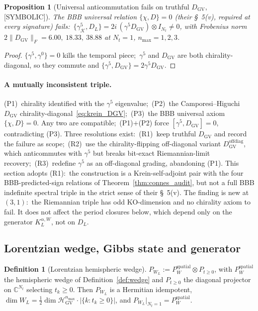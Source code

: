 \documentclass[11pt,a4paper]{article}
\theoremstyle{plain}
\newtheorem{proposition}[theorem]{Proposition}
\theoremstyle{definition}
\newtheorem{definition}[theorem]{Definition}
\newcommand{\nmax}{n_{\max}}
\newcommand{\Hilb}{\mathcal{H}}
\newcommand{\Frob}[1]{\lVert #1 \rVert_{F}}
\newcommand{\C}{\mathbb{C}}
\newcommand{\Krein}{\mathcal{K}}
\newcommand{\Nt}{N_t}
\newcommand{\DGV}{D_{\mathrm{GV}}}
\newcommand{\DL}{D_{L}}
\newcommand{\KL}{K_{L}}
\begin{document}
\begin{proposition}[Universal anticommutation fails on truthful $\DGV$,
{[SYMBOLIC]}]\label{prop:bbb_axiom_failure}
The BBB universal relation $\{\chi, D\} = 0$ (their \S~5(v), required
at every signature) fails:\
$\{\gamma^5_{\Krein}, \DL\} = 2i\,(\gamma^5\DGV)\otimes I_{\Nt} \ne 0$,
with Frobenius norm $2\Frob{\DGV} = 6.00,\ 18.33,\ 38.88$ at
$\Nt = 1$, $\nmax = 1, 2, 3$.
\end{proposition}

\begin{proof}
$\{\gamma^5, \gamma^0\} = 0$ kills the temporal piece;\ $\gamma^5$ and
$\DGV$ are both chirality-diagonal, so they commute and
$\{\gamma^5, \DGV\} = 2\gamma^5\DGV$.
\end{proof}

\paragraph{A mutually inconsistent triple.}
\label{sec:bbb_axiom_finding}
(P1)~chirality identified with the $\gamma^5$ eigenvalue;\
(P2)~the Camporesi--Higuchi $\DGV$ chirality-diagonal~\eqref{eq:krein_DGV};\
(P3)~the BBB universal axiom $\{\chi, D\} = 0$.
Any two are compatible;\ (P1)$+$(P2) force $[\gamma^5, \DGV] = 0$,
contradicting (P3).  Three resolutions exist:\ (R1)~keep truthful $\DGV$
and record the failure as scope;\ (R2)~use the chirality-flipping
off-diagonal variant $\DGV^{\mathrm{offdiag}}$, which anticommutes with
$\gamma^5$ but breaks bit-exact Riemannian-limit recovery;\ (R3)~redefine
$\gamma^5$ as an off-diagonal grading, abandoning (P1).  This section
adopts (R1):\ the construction is a Krein-self-adjoint pair with the four
BBB-predicted-sign relations of Theorem~\ref{thm:connes_audit}, but not a
full BBB indefinite spectral triple in the strict sense of their
\S~5(v).  The finding is new at $(3, 1)$:\ the Riemannian triple has
odd KO-dimension and no chirality axiom to fail.  It does not affect the
period closures below, which depend only on the generator
$\KL^{\alpha, W}$, not on $\DL$.

\subsection{Lorentzian wedge, Gibbs state and generator}
\label{sec:krein_wedge}

\begin{definition}[Lorentzian hemispheric wedge]\label{def:wedge_L}
$P_{W_L} := P_W^{\mathrm{spatial}} \otimes P_{t \ge 0}$, with
$P_W^{\mathrm{spatial}}$ the hemispheric wedge of
Definition~\ref{def:wedge} and $P_{t\ge 0}$ the diagonal projector on
$\C^{\Nt}$ selecting $t_k \ge 0$.  Then $P_{W_L}$ is a Hermitian
idempotent, $\dim W_L = \tfrac12\dim\Hilb_{\mathrm{GV}}^{\nmax}\cdot
|\{k : t_k \ge 0\}|$, and $P_{W_L}|_{\Nt=1} = P_W^{\mathrm{spatial}}$.
\end{definition}
\end{document}
